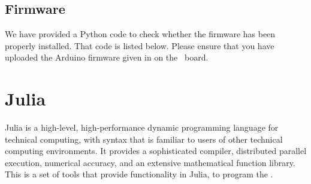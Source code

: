             
            
            
            

\subsection{Firmware}
\lstset{style=mystyle}
\label{sec:test-firmware-python}
We have provided a Python code to check whether the firmware has been
properly installed. That code is listed below. 
Please ensure that you have uploaded the Arduino firmware given in  on the \arduino\ board.


\begin{pycode}
      \label{py:test-firmware}
      
\end{pycode}








\section{Julia}
\label{sec:julia-start}
Julia is a high-level, high-performance dynamic programming language for
technical computing, with syntax that is familiar to users of other technical
computing environments. It provides a sophisticated compiler, distributed
parallel execution, numerical accuracy, and an extensive mathematical function
library. This is a set of tools that provide functionality in Julia, to program the
\arduino. 

